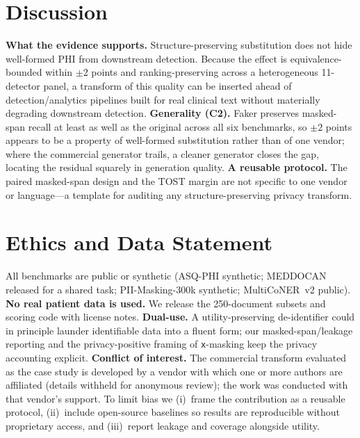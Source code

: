 \documentclass[pmlr,twocolumn,10pt]{jmlr}
\newcommand{\tp}[1]{\texttt{#1}}
\begin{document}
\section{Discussion}
\textbf{What the evidence supports.} Structure-preserving substitution does not hide well-formed PHI from downstream detection. Because the effect is equivalence-bounded within $\pm2$ points and ranking-preserving across a heterogeneous 11-detector panel, a transform of this quality can be inserted ahead of detection/analytics pipelines built for real clinical text without materially degrading downstream detection. \textbf{Generality (C2).} Faker preserves masked-span recall at least as well as the original across all six benchmarks, so $\pm2$ points appears to be a property of well-formed substitution rather than of one vendor; where the commercial generator trails, a cleaner generator closes the gap, locating the residual squarely in generation quality. \textbf{A reusable protocol.} The paired masked-span design and the TOST margin are not specific to one vendor or language---a template for auditing any structure-preserving privacy transform.

\section{Ethics and Data Statement}
All benchmarks are public or synthetic (ASQ-PHI synthetic; MEDDOCAN released for a shared task; PII-Masking-300k synthetic; MultiCoNER~v2 public). \textbf{No real patient data is used.} We release the 250-document subsets and scoring code with license notes. \textbf{Dual-use.} A utility-preserving de-identifier could in principle launder identifiable data into a fluent form; our masked-span/leakage reporting and the privacy-positive framing of \tp{x}-masking keep the privacy accounting explicit. \textbf{Conflict of interest.} The commercial transform evaluated as the case study is developed by a vendor with which one or more authors are affiliated (details withheld for anonymous review); the work was conducted with that vendor's support. To limit bias we (i)~frame the contribution as a reusable protocol, (ii)~include open-source baselines so results are reproducible without proprietary access, and (iii)~report leakage and coverage alongside utility.
\end{document}
